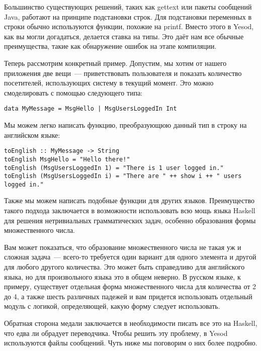 Большинство существующих решений, таких как gettext или пакеты сообщений Java, работают на принципе подстановки строк. Для подстановки переменных в строки обычно используются функции, похожие на printf. Вместо этого в Yesod, как вы могли догадаться, делается ставка на типы. Это даёт нам все обычные преимущества, такие как обнаружение ошибок на этапе компиляции.

Теперь рассмотрим конкретный пример. Допустим, мы хотим от нашего приложения две вещи~--- приветствовать пользователя и показать количество посетителей, использующих систему в текущий момент. Это можно смоделировать с помощью следующего типа:

\begin{lstlisting}
data MyMessage = MsgHello | MsgUsersLoggedIn Int
\end{lstlisting}

Мы можем легко написать функцию, преобразующюю данный тип в строку на английском языке:

\begin{lstlisting}
toEnglish :: MyMessage -> String
toEnglish MsgHello = "Hello there!"
toEnglish (MsgUsersLoggedIn 1) = "There is 1 user logged in."
toEnglish (MsgUsersLoggedIn i) = "There are " ++ show i ++ " users logged in."
\end{lstlisting}

Также мы можем написать подобные функции для других языков. Преимущество такого подхода заключается в возможности использовать всю мощь языка Haskell для решения нетривиальных грамматических задач, особенно образования формы множественного числа. %

\begin{remark}
Вам может показаться, что образование множественного числа не такая уж и сложная задача~--- всего-то требуется один вариант для одного элемента и другой для любого другого количества. Это может быть справедливо для английского языка, но для произвольного языка это в общем неверно. В русском языке, к примеру, существует отдельная форма множественного числа для количества от 2 до 4, а также шесть различных падежей и вам придется использовать отдельный модуль с логикой, определяющей, какую форму следует использовать.
\end{remark}

Обратная сторона медали заключается в необходимости писать все это на Haskell, что едва ли обрадует переводчика. Чтобы решить эту проблему, в Yesod используются файлы сообщений. Чуть ниже мы поговорим о них более подробно. %

